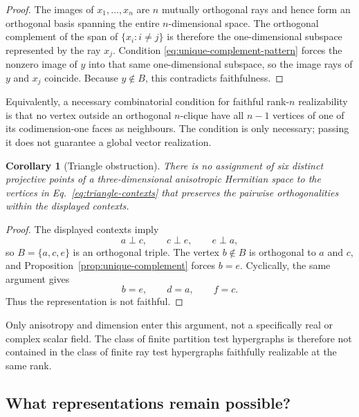 \documentclass[
  aps,
  pra,
  twocolumn,
  amsmath,
  amssymb,
  longbibliography,
  nofootinbib,
  floatfix
]{revtex4-2}
\newtheorem{corollary}{Corollary}
\begin{document}
\begin{proof}
The images of $x_1,\ldots,x_n$ are $n$ mutually orthogonal rays and hence form
an orthogonal basis spanning the entire $n$-dimensional space.  The orthogonal
complement of the span of $\{x_i:i\ne j\}$ is therefore the one-dimensional
subspace represented by the ray $x_j$.  Condition
\eqref{eq:unique-complement-pattern} forces the nonzero image of $y$ into that
same one-dimensional subspace, so the image rays of $y$ and $x_j$ coincide.
Because $y\notin B$, this contradicts faithfulness.
\end{proof}

Equivalently, a necessary combinatorial condition for faithful rank-$n$
realizability is that no vertex outside an orthogonal $n$-clique have all
$n-1$ vertices of one of its codimension-one faces as neighbours.  The
condition is only necessary; passing it does not guarantee a global vector
realization.

\begin{corollary}[Triangle obstruction]
There is no assignment of six distinct projective points of a
three-dimensional anisotropic Hermitian space to the vertices in
Eq.~\eqref{eq:triangle-contexts} that preserves the pairwise orthogonalities
within the displayed contexts.
\end{corollary}

\begin{proof}
The displayed contexts imply
\begin{equation}
  a\perp c,\qquad c\perp e,\qquad e\perp a,
  \label{eq:corner-orthogonality}
\end{equation}
so $B=\{a,c,e\}$ is an orthogonal triple.  The vertex $b\notin B$ is
orthogonal to $a$ and $c$, and Proposition~\ref{prop:unique-complement}
forces $b=e$.  Cyclically, the same argument gives
\begin{equation}
  b=e,\qquad d=a,\qquad f=c.
  \label{eq:triangle-collapse}
\end{equation}
Thus the representation is not faithful.
\end{proof}

Only anisotropy and dimension enter this argument, not a specifically real or
complex scalar field.  The class of finite partition test hypergraphs is
therefore not contained in the class of finite ray test hypergraphs faithfully
realizable at the same rank.

\subsection{What representations remain possible?}
\end{document}
